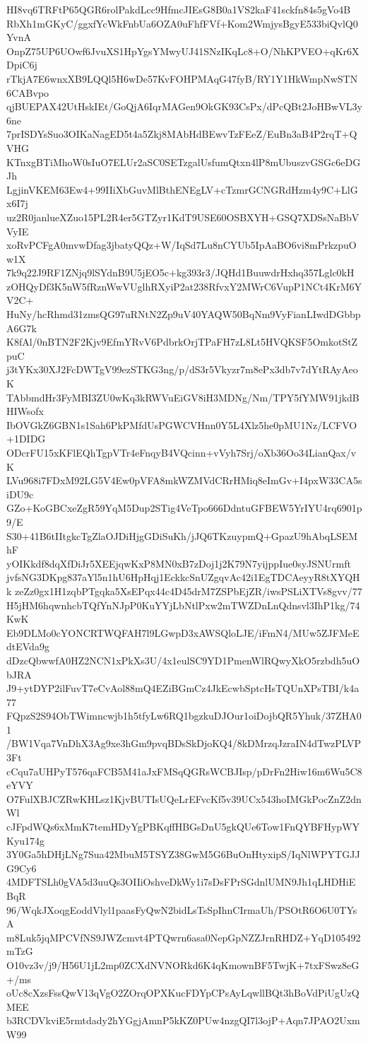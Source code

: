 HI8vq6TRFtP65QGR6rolPakdLcc9HfmcJIEsG8B0a1VS2kaF41sckfn84s5gVo4B
RbXh1mGKyC/ggxfYcWkFnbUa6OZA0uFhfFVf+Kom2WmjysBgyE533biQvlQ0YvnA
OnpZ75UP6UOwf6JvuXS1HpYgsYMwyUJ41SNzIKqLc8+O/NhKPVEO+qKr6XDpiC6j
rTkjA7E6wnxXB9LQQl5H6wDe57KvFOHPMAqG47fyB/RY1Y1HkWmpNwSTN6CABvpo
qjBUEPAX42UtHskIEt/GoQjA6IqrMAGen9OkGK93CsPx/dPcQBt2JoHBwVL3y6ne
7prISDYsSuo3OIKaNagED5t4a5Zkj8MAbHdBEwvTzFEeZ/EuBn3aB4P2rqT+QVHG
KTnxgBTiMhoW0sIuO7ELUr2aSC0SETzgalUsfumQtxn4lP8mUbuszvGSGc6eDGJh
LgjinVKEM63Ew4+99IIiXbGuvMlBthENEgLV+cTzmrGCNGRdHzm4y9C+LlGx6I7j
uz2R0janlueXZuo15PL2R4er5GTZyr1KdT9USE60OSBXYH+GSQ7XDSsNaBbVVyIE
xoRvPCFgA0mvwDfag3jbatyQQz+W/IqSd7Lu8nCYUb5IpAaBO6vi8mPrkzpuOw1X
7k9q22J9RF1ZNjq9lSYdnB9U5jEO5c+kg393r3/JQHd1BuuwdrHxhq357Lglc0kH
zOHQyDf3K5nW5fRznWwVUglhRXyiP2at238RfvxY2MWrC6VupP1NCt4KrM6YV2C+
HuNy/hcRhmd31zmsQG97uRNtN2Zp9uV40YAQW50BqNm9VyFianLIwdDGbbpA6G7k
K8fAl/0nBTN2F2Kjv9EfmYRvV6PdbrkOrjTPaFH7zL8Lt5HVQKSF5OmkotStZpuC
j3tYKx30XJ2FcDWTgV99ezSTKG3ng/p/dS3r5Vkyzr7m8ePx3db7v7dYtRAyAeoK
TAbbmdHr3FyMBI3ZU0wKq3kRWVuEiGV8iH3MDNg/Nm/TPY5fYMW91jkdBHIWsofx
IbOVGkZ6GBN1s1Sah6PkPMfdUsPGWCVHnn0Y5L4Xlz5he0pMU1Nz/LCFVO+1DIDG
ODcrFU15xKFlEQhTgpVTr4eFnqyB4VQcinn+vVyh7Srj/oXb36Oo34LianQax/vK
LVu968i7FDxM92LG5V4Ew0pVFA8mkWZMVdCRrHMiq8eImGv+I4pxW33CA5siDU9c
GZo+KoGBCxeZgR59YqM5Dup2STig4VeTpo666DdntuGFBEW5YrIYU4rq6901p9/E
S30+41B6tIItgkcTgZlaOJDiHjgGDiSuKh/jJQ6TKzuypmQ+GpazU9hAbqLSEMhF
yOIKkdf8dqXfDiJr5XEEjqwKxP8MN0xB7zDoj1j2K79N7yijppIue0syJSNUrmft
jvfsNG3DKpg837aYl5n1hU6HpHqj1EckkcSnUZgqvAc42i1EgTDCAeyyR8tXYQHk
zeZz0gx1H1zqbPTgqka5XsEPqx44c4D45drM7ZSPbEjZR/iwsPSLiXTVs8gvv/77
H5jHM6hqwnhcbTQfYnNJpP0KuYYjLbNtlPxw2mTWZDnLnQdnsvl3IhP1kg/74KwK
Eb9DLMo0cYONCRTWQFAH7l9LGwpD3xAWSQloLJE/iFmN4/MUw5ZJFMeEdtEVda9g
dDzcQbwwfA0HZ2NCN1xPkXs3U/4x1eulSC9YD1PmenWlRQwyXkO5rzbdh5uObJRA
J9+ytDYP2ilFuvT7eCvAol88mQ4EZiBGmCz4JkEcwbSptcHsTQUnXPsTBI/k4a77
FQpzS2S94ObTWimncwjb1h5tfyLw6RQ1bgzkuDJOur1oiDojbQR5Yhuk/37ZHA01
/BW1Vqa7VnDhX3Ag9xe3hGm9pvqBDsSkDjoKQ4/8kDMrzqJzraIN4dTwzPLVP3Ft
cCqu7aUHPyT576qaFCB5M41aJxFMSqQGRsWCBJIsp/pDrFn2Hiw16m6Wu5C8eYVY
O7FulXBJCZRwKHLsz1KjvBUTIsUQeLrEFvcKf5v39UCx543hoIMGkPocZnZ2dnWl
cJFpdWQs6xMmK7temHDyYgPBKqffHBGsDnU5gkQUe6Tow1FnQYBFHypWYKyu174g
3Y0Ga5hDHjLNg7Sua42MbuM5TSYZ38GwM5G6BuOnHtyxipS/IqNlWPYTGJJG9Cy6
4MDFTSLh0gVA5d3uuQs3OIIiOshveDkWy1i7sDsFPrSGdnlUMN9Jh1qLHDHiEBqR
96/WqkJXoqgEoddVlyl1paasFyQwN2bidLsTsSpIhnCIrmaUh/PSOtR6O6U0TYsA
m8Luk5jqMPCVfNS9JWZcmvt4PTQwrn6asa0NepGpNZZJrnRHDZ+YqD105492mTzG
O10vz3v/j9/H56U1jL2mp0ZCXdNVNORkd6K4qKmownBF5TwjK+7txFSwz8eG+/ms
oUc8cXzsFssQwV13qVgO2ZOrqOPXKucFDYpCPsAyLqwllBQt3hBoVdPiUgUzQMEE
b3RCDVkviE5rmtdady2hYGgjAmnP5kKZ0PUw4nzgQI7l3ojP+Aqn7JPAO2UxmW99
